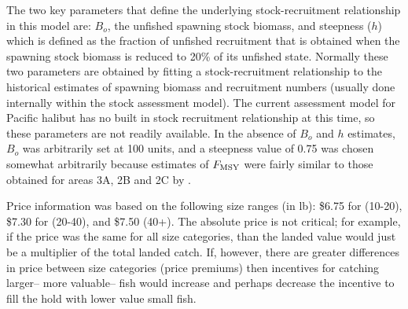 The two key parameters that define the underlying stock-recruitment relationship in this model are: $B_o$, the unfished spawning stock biomass, and steepness ($h$) which is defined as the fraction of unfished recruitment that is obtained when the spawning stock biomass is reduced to 20\% of its unfished state.  Normally these two parameters are obtained by fitting a stock-recruitment relationship to the historical estimates of spawning biomass and recruitment numbers (usually done internally within the stock assessment model).  The current assessment model for Pacific halibut has no built in stock recruitment relationship at this time, so these parameters are not readily available.  In the absence of $B_o$ and $h$ estimates, $B_o$ was arbitrarily set at 100 units,  and a steepness value of 0.75 was chosen somewhat arbitrarily because estimates of $F_{\rm{MSY}}$ were fairly similar to those obtained for areas 3A, 2B and 2C by \cite{clark2006assessment}.

Price information was based on the following size ranges (in lb): \$6.75 for (10-20), \$7.30 for (20-40), and \$7.50 (40+). The absolute price  is not critical; for example, if the price was the same for all size categories, than the landed value would just be a multiplier of the total landed catch.  If, however, there are greater differences in price between size categories (price premiums) then incentives for catching larger-- more valuable-- fish would increase and perhaps decrease the incentive to fill the hold with lower value small fish.


